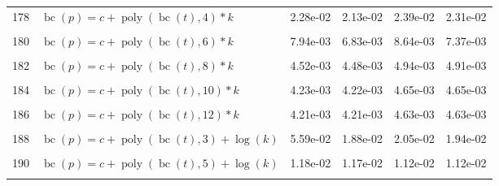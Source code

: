 \documentclass[12pt,a4paper]{article}
\DeclareMathOperator{\bc}{bc}
\DeclareMathOperator{\poly}{poly}
\begin{document}
\begin{longtable}[t]{ll>{\raggedleft\arraybackslash}p{2cm}>{\raggedleft\arraybackslash}p{2cm}>{\raggedleft\arraybackslash}p{2cm}>{\raggedleft\arraybackslash}p{2cm}}
178 & $\bc(p) = c + \poly\left( \bc(t), 4 \right) * k$ & 2.28e-02 & 2.13e-02 & 2.39e-02 & 2.31e-02\\
\cellcolor{gray!6}{179} & \cellcolor{gray!6}{$\bc(p) = c + \poly\left( \bc(t), 5 \right) * k$} & \cellcolor{gray!6}{9.94e-03} & \cellcolor{gray!6}{9.93e-03} & \cellcolor{gray!6}{9.77e-03} & \cellcolor{gray!6}{9.77e-03}\\
180 & $\bc(p) = c + \poly\left( \bc(t), 6 \right) * k$ & 7.94e-03 & 6.83e-03 & 8.64e-03 & 7.37e-03\\
\cellcolor{gray!6}{181} & \cellcolor{gray!6}{$\bc(p) = c + \poly\left( \bc(t), 7 \right) * k$} & \cellcolor{gray!6}{7.15e-03} & \cellcolor{gray!6}{5.48e-03} & \cellcolor{gray!6}{6.32e-03} & \cellcolor{gray!6}{5.92e-03}\\
182 & $\bc(p) = c + \poly\left( \bc(t), 8 \right) * k$ & 4.52e-03 & 4.48e-03 & 4.94e-03 & 4.91e-03\\
\cellcolor{gray!6}{183} & \cellcolor{gray!6}{$\bc(p) = c + \poly\left( \bc(t), 9 \right) * k$} & \cellcolor{gray!6}{4.59e-03} & \cellcolor{gray!6}{4.54e-03} & \cellcolor{gray!6}{5.04e-03} & \cellcolor{gray!6}{4.98e-03}\\
184 & $\bc(p) = c + \poly\left( \bc(t), 10 \right) * k$ & 4.23e-03 & 4.22e-03 & 4.65e-03 & 4.65e-03\\
\cellcolor{gray!6}{185} & \cellcolor{gray!6}{$\bc(p) = c + \poly\left( \bc(t), 11 \right) * k$} & \cellcolor{gray!6}{4.24e-03} & \cellcolor{gray!6}{4.23e-03} & \cellcolor{gray!6}{4.66e-03} & \cellcolor{gray!6}{4.65e-03}\\
186 & $\bc(p) = c + \poly\left( \bc(t), 12 \right) * k$ & 4.21e-03 & 4.21e-03 & 4.63e-03 & 4.63e-03\\
\cellcolor{gray!6}{187} & \cellcolor{gray!6}{$\bc(p) = c + \poly\left( \bc(t), 13 \right) * k$} & \cellcolor{gray!6}{4.20e-03} & \cellcolor{gray!6}{4.20e-03} & \cellcolor{gray!6}{4.63e-03} & \cellcolor{gray!6}{4.63e-03}\\
188 & $\bc(p) = c + \poly\left( \bc(t), 3 \right) + \log(k)$ & 5.59e-02 & 1.88e-02 & 2.05e-02 & 1.94e-02\\
\cellcolor{gray!6}{189} & \cellcolor{gray!6}{$\bc(p) = c + \poly\left( \bc(t), 4 \right) + \log(k)$} & \cellcolor{gray!6}{2.38e-02} & \cellcolor{gray!6}{2.24e-02} & \cellcolor{gray!6}{2.47e-02} & \cellcolor{gray!6}{2.40e-02}\\
190 & $\bc(p) = c + \poly\left( \bc(t), 5 \right) + \log(k)$ & 1.18e-02 & 1.17e-02 & 1.12e-02 & 1.12e-02\\
\cellcolor{gray!6}{191} & \cellcolor{gray!6}{$\bc(p) = c + \poly\left( \bc(t), 6 \right) + \log(k)$} & \cellcolor{gray!6}{1.00e-02} & \cellcolor{gray!6}{9.13e-03} & \cellcolor{gray!6}{1.02e-02} & \cellcolor{gray!6}{9.13e-03}\\

\end{longtable}
\end{document}
